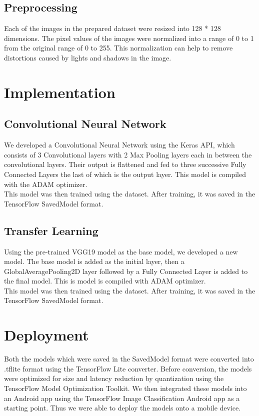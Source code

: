 \subsection{Preprocessing}
Each of the images in the prepared dataset were resized into 128 * 128 dimensions. The pixel values of the images were normalized into a range of 0 to 1 from the original range of 0 to 255. This normalization can help to remove distortions caused by lights and shadows in the image.

\section{Implementation}
\subsection{Convolutional Neural Network}
We developed a Convolutional Neural Network using the Keras API, which consists of 3 Convolutional layers with 2 Max Pooling layers each in between the convolutional layers. Their output is flattened and fed to three successive Fully Connected Layers the last of which is the output layer. This model is compiled with the ADAM optimizer.\\

This model was then trained using the dataset. After training, it was saved in the TensorFlow SavedModel format.

\subsection{Transfer Learning}
Using the pre-trained VGG19 model as the base model, we developed a new model. The base model is added as the initial layer, then a GlobalAveragePooling2D layer followed by a Fully Connected Layer is added to the final model. This is model is compiled with ADAM optimizer.\\

This model was then trained using the dataset. After training, it was saved in the TensorFlow SavedModel format.

\section{Deployment}
Both the models which were saved in the SavedModel format were converted into .tflite format using the TensorFlow Lite converter. Before conversion, the models were optimized for size and latency reduction by quantization using the TensorFlow Model Optimization Toolkit. We then integrated these models into an Android app using the TensorFlow Image Classification Android app as a starting point. Thus we were able to deploy the models onto a mobile device.


